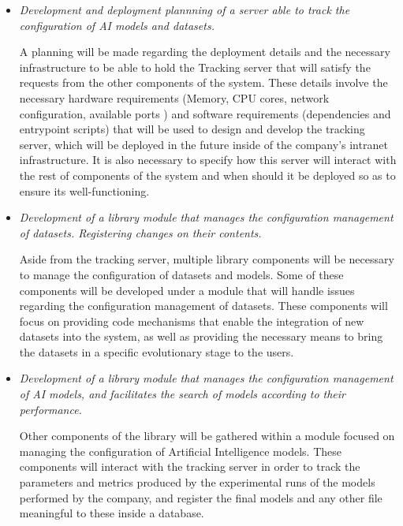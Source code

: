 \begin{itemize}
	\item \emph{Development and deployment plannning of a server able to track the configuration of \acrshort{AI} models and datasets.}
	
	A planning will be made regarding the deployment details and the necessary infrastructure to be able to hold the Tracking server that will satisfy the requests from the
	other components of the system. These details involve the necessary hardware requirements (Memory, CPU cores, network configuration, available ports ) and 
	software requirements (dependencies and entrypoint scripts) that will be used to design and develop the tracking server, which will be deployed in the future inside of the
	company's intranet infrastructure. It is also necessary to specify how this server will interact with the rest of components of the system and when should it be 
	deployed so as to ensure its well-functioning.

	\item \emph{Development of a library module that manages the configuration management of datasets. Registering changes on their contents.}
	
	Aside from the tracking server, multiple library components will be necessary to manage the configuration of datasets and models. Some of these components will be developed
	under a module that will handle issues regarding the configuration management of datasets. These components will focus on providing code mechanisms that enable the integration
	of new datasets into the system, as well as providing the necessary means to bring the datasets in a specific evolutionary stage to the users.

	\item \emph{Development of a library module that manages the configuration management of AI models, and facilitates the search of models according to their performance.}
	
	Other components of the library will be gathered within a module focused on managing the configuration of Artificial Intelligence models. These components will interact
	with the tracking server in order to track the parameters and metrics produced by the experimental runs of the models performed by the company, and register the final models
	and any other file meaningful to these inside a database.
\end{itemize}
